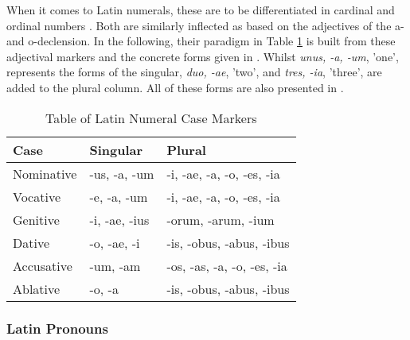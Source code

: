 \documentclass[11pt,a4paper,twoside,openright]{scrbook}
\begin{document}
When it comes to Latin numerals, these are to be differentiated in cardinal and ordinal numbers \citep{rubenbauer1995lat}. Both are similarly inflected as based on the adjectives of the a- and o-declension. In the following, their paradigm in Table \ref{table:latin_numeralss} is built from these adjectival markers and the concrete forms given in \citet{rubenbauer1995lat}. Whilst \textit{unus, -a, -um}, 'one', represents the forms of the singular, \textit{duo, -ae}, 'two', and \textit{tres, -ia}, 'three', are added to the plural column. All of these forms are also presented in \citet{panhuis2015lat}.

\begin{table}[!htbp]
\centering

\begin{tabular}{|p{}||p{5cm}|p{5cm}|}
 \hline
 Case & Singular & Plural \\ [1ex]
 \hline\hline
 Nominative & -us, -a, -um  & -i, -ae, -a, -o, -es, -ia \\ [1ex] 
 \hline
 Vocative & -e, -a, -um & -i, -ae, -a, -o, -es, -ia \\ [1ex] 
 \hline
 Genitive & -i, -ae, -ius & -orum, -arum, -ium  \\ [1ex]
 \hline 
 Dative & -o, -ae, -i  & -is, -obus, -abus, -ibus  \\ [1ex]
 \hline
 Accusative & -um, -am  & -os, -as, -a, -o, -es, -ia   \\ [1ex] 
 \hline
 Ablative & -o, -a  & -is, -obus, -abus, -ibus  \\ [1ex]
 \hline
\end{tabular}
\caption{Table of Latin Numeral Case Markers}
\label{table:latin_numeralss}
\end{table}




\subsubsection{Latin Pronouns}
\end{document}
